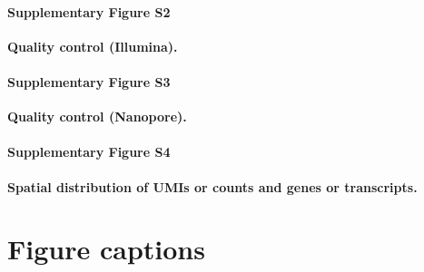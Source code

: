 \documentclass[utf8]{FrontiersinHarvard} %
\begin{document}
\paragraph*{Supplementary Figure S2}
\label{fig:S2}
{\bf Quality control (Illumina).}

\paragraph*{Supplementary Figure S3}
\label{fig:S3}
{\bf Quality control (Nanopore).}

\paragraph*{Supplementary Figure S4}
\label{fig:S4}
{\bf Spatial distribution of UMIs or counts and genes or transcripts.}






\section*{Figure captions}

\end{document}
